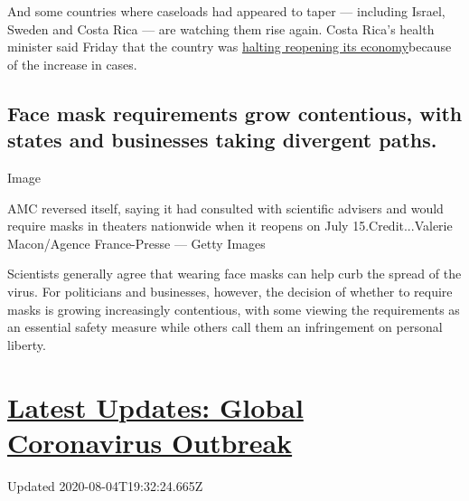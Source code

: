 And some countries where caseloads had appeared to taper --- including
Israel, Sweden and Costa Rica --- are watching them rise again. Costa
Rica's health minister said Friday that the country was
\href{https://www.reuters.com/article/us-health-coronavirus-costa-rica/costa-rica-halts-reopening-as-coronavirus-infections-keep-rising-idUSKBN23Q37L}{halting
reopening its economy}because of the increase in cases.

\hypertarget{face-mask-requirements-grow-contentious-with-states-and-businesses-taking-divergent-paths}{%
\subsection{Face mask requirements grow contentious, with states and
businesses taking divergent
paths.}\label{face-mask-requirements-grow-contentious-with-states-and-businesses-taking-divergent-paths}}

Image

AMC reversed itself, saying it had consulted with scientific advisers
and would require masks in theaters nationwide when it reopens on July
15.Credit...Valerie Macon/Agence France-Presse --- Getty Images

Scientists generally agree that wearing face masks can help curb the
spread of the virus. For politicians and businesses, however, the
decision of whether to require masks is growing increasingly
contentious, with some viewing the requirements as an essential safety
measure while others call them an infringement on personal liberty.

\hypertarget{latest-updates-global-coronavirus-outbreak}{%
\section{\texorpdfstring{\href{https://www.nytimes3xbfgragh.onion/2020/08/04/world/coronavirus-cases.html?action=click\&pgtype=Article\&state=default\&region=MAIN_CONTENT_1\&context=storylines_live_updates}{Latest
Updates: Global Coronavirus
Outbreak}}{Latest Updates: Global Coronavirus Outbreak}}\label{latest-updates-global-coronavirus-outbreak}}

Updated 2020-08-04T19:32:24.665Z

